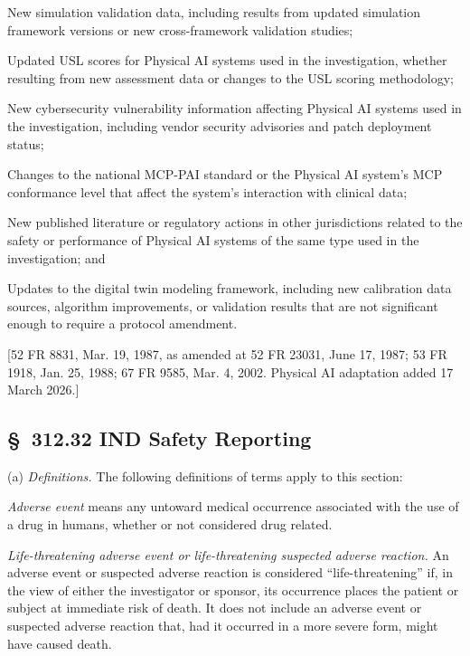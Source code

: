 \documentclass[11pt]{article}
\begin{document}
\begin{description}[leftmargin=0.8cm,style=sameline]
\item[(i)] New simulation validation data, including results from updated simulation framework versions or new cross-framework validation studies;
\item[(ii)] Updated USL scores for Physical AI systems used in the investigation, whether resulting from new assessment data or changes to the USL scoring methodology;
\item[(iii)] New cybersecurity vulnerability information affecting Physical AI systems used in the investigation, including vendor security advisories and patch deployment status;
\item[(iv)] Changes to the national MCP-PAI standard or the Physical AI system's MCP conformance level that affect the system's interaction with clinical data;
\item[(v)] New published literature or regulatory actions in other jurisdictions related to the safety or performance of Physical AI systems of the same type used in the investigation; and
\item[(vi)] Updates to the digital twin modeling framework, including new calibration data sources, algorithm improvements, or validation results that are not significant enough to require a protocol amendment.
\end{description}

[52 FR 8831, Mar. 19, 1987, as amended at 52 FR 23031, June 17, 1987; 53 FR 1918, Jan. 25, 1988; 67 FR 9585, Mar. 4, 2002. Physical AI adaptation added 17 March 2026.]

\subsection{\S~312.32 IND Safety Reporting}

(a) \textit{Definitions.} The following definitions of terms apply to this section:

\textit{Adverse event} means any untoward medical occurrence associated with the use of a drug in humans, whether or not considered drug related.

\textit{Life-threatening adverse event or life-threatening suspected adverse reaction.} An adverse event or suspected adverse reaction is considered ``life-threatening'' if, in the view of either the investigator or sponsor, its occurrence places the patient or subject at immediate risk of death. It does not include an adverse event or suspected adverse reaction that, had it occurred in a more severe form, might have caused death.
\end{document}
